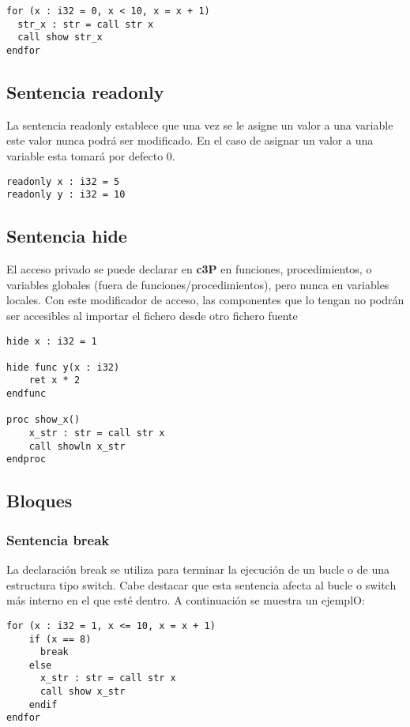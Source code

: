 \begin{verbatim}
for (x : i32 = 0, x < 10, x = x + 1)
  str_x : str = call str x
  call show str_x
endfor
\end{verbatim}

\subsection{Sentencia readonly}

La sentencia readonly establece que una vez se le asigne un valor a una variable este valor nunca podrá ser modificado. En el caso de asignar un valor a una variable esta tomará por defecto 0.

\begin{verbatim}
readonly x : i32 = 5
readonly y : i32 = 10
\end{verbatim}

\subsection{Sentencia hide}

El acceso privado se puede declarar en \textbf{c3P} en funciones, procedimientos,
o variables globales (fuera de funciones/procedimientos), pero nunca en variables
locales. Con este modificador de acceso, las componentes que lo tengan no podrán
ser accesibles al importar el fichero desde otro fichero fuente

\begin{verbatim}
hide x : i32 = 1

hide func y(x : i32)
    ret x * 2
endfunc

proc show_x()
    x_str : str = call str x
    call showln x_str
endproc
\end{verbatim}

\subsection{Bloques}
\subsubsection{Sentencia break}

La declaración break se utiliza para terminar la ejecución de un bucle
o de una estructura tipo switch. Cabe destacar que esta sentencia afecta
al bucle o switch más interno en el que esté dentro.
A continuación se muestra un ejemplO:

\begin{verbatim}
for (x : i32 = 1, x <= 10, x = x + 1)
    if (x == 8)
      break
    else
      x_str : str = call str x
      call show x_str
    endif
endfor
\end{verbatim}

